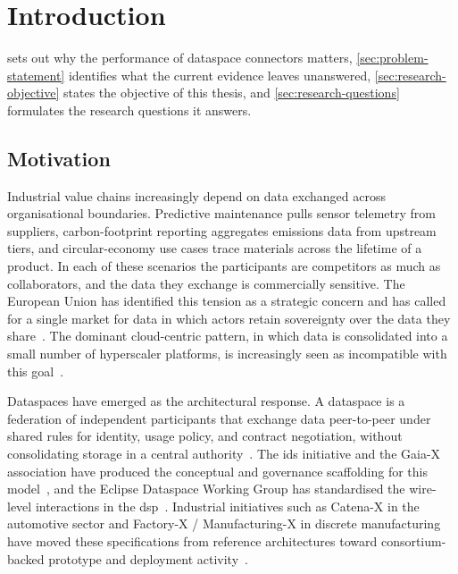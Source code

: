 \chapter{Introduction}\label{chap:introduction}

 sets out why the performance of dataspace connectors matters, \cref{sec:problem-statement} identifies what the current evidence leaves unanswered, \cref{sec:research-objective} states the objective of this thesis, and \cref{sec:research-questions} formulates the research questions it answers.

\section{Motivation}\label{sec:motivation}

Industrial value chains increasingly depend on data exchanged across organisational boundaries. Predictive maintenance pulls sensor telemetry from suppliers, carbon-footprint reporting aggregates emissions data from upstream tiers, and circular-economy use cases trace materials across the lifetime of a product. In each of these scenarios the participants are competitors as much as collaborators, and the data they exchange is commercially sensitive. The European Union has identified this tension as a strategic concern and has called for a single market for data in which actors retain sovereignty over the data they share~\citep{europeancommission2020}. The dominant cloud-centric pattern, in which data is consolidated into a small number of hyperscaler platforms, is increasingly seen as incompatible with this goal~\citep{designingdataspace}.

Dataspaces have emerged as the architectural response. A dataspace is a federation of independent participants that exchange data peer-to-peer under shared rules for identity, usage policy, and contract negotiation, without consolidating storage in a central authority~\citep{IDS4.0}. The \gls{ids} initiative and the Gaia-X association have produced the conceptual and governance scaffolding for this model~\citep{IDS4.0, GaiaXTrustFramework2024}, and the Eclipse Dataspace Working Group has standardised the wire-level interactions in the \gls{dsp}~\citep{datapsaceProtocol2025}. Industrial initiatives such as Catena-X in the automotive sector and Factory-X / Manufacturing-X in discrete manufacturing have moved these specifications from reference architectures toward consortium-backed prototype and deployment activity~\citep{catenaxDocumentation}.

